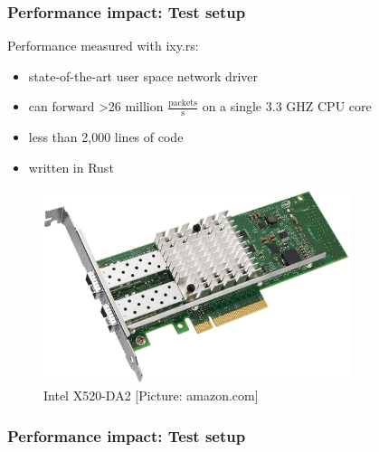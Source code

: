 \begin{frame}[fragile]
    \frametitle{Performance impact: Test setup}

    \begin{minipage}{0.5\textwidth}
        Performance measured with ixy.rs:

        \begin{itemize}
            \item state-of-the-art user space network driver
            \item can forward >26 million $\frac{\text{packets}}{\text{s}}$ on
                a single 3.3 GHZ CPU core
            \item less than 2,000 lines of code
            \item written in Rust
        \end{itemize}
    \end{minipage}%
    \begin{minipage}[c]{0.5\textwidth}
        \begin{figure}
            \centering
            \includegraphics[width=0.8\textwidth,clip,trim=0cm 0cm 0cm
            0cm]{pics/intel_x520_da2.jpg}
            \caption{Intel X520-DA2 [Picture: amazon.com]}
        \end{figure}
    \end{minipage}
\end{frame}

\begin{frame}
    \frametitle{Performance impact: Test setup}

    \centering
\end{frame}

